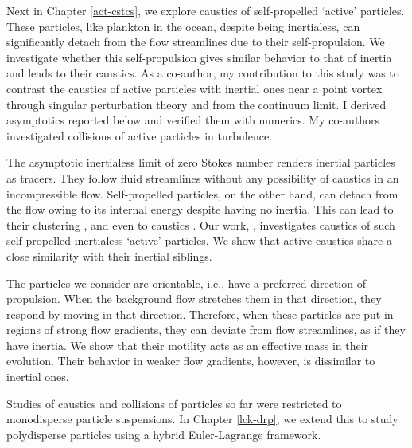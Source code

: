 \documentclass[../Rajarshi-thesis-draft.tex]{subfiles}
\begin{document}

Next in Chapter \ref{act-cstcs}, we explore caustics of self-propelled `active' particles. These particles, like plankton in the ocean, despite being inertialess, can significantly detach from the flow streamlines due to their self-propulsion. We investigate whether this self-propulsion gives similar behavior to that of inertia and leads to their caustics. As a co-author, my contribution to this study was to contrast the caustics of active particles with inertial ones near a point vortex through singular perturbation theory and from the continuum limit. I derived asymptotics reported below and verified them with numerics. My co-authors investigated collisions of active particles in turbulence.


The asymptotic inertialess limit of zero Stokes number renders inertial particles as tracers. They follow fluid streamlines without any possibility of caustics in an incompressible flow. Self-propelled particles, on the other hand, can detach from the flow owing to its internal energy despite having no inertia. This can lead to their clustering \cite{durham2013}, and even to caustics \cite{chajwa2026}. Our work, \citet{chajwa2026}, investigates caustics of such self-propelled inertialess `active' particles. We show that active caustics share a close similarity with their inertial siblings.

The particles we consider are orientable, i.e., have a preferred direction of propulsion. When the background flow stretches them in that direction, they respond by moving in that direction. Therefore, when these particles are put in regions of strong flow gradients, they can deviate from flow streamlines, as if they have inertia. We show that their motility acts as an effective mass in their evolution. Their behavior in weaker flow gradients, however, is dissimilar to inertial ones.


Studies of caustics and collisions of particles so far were restricted to monodisperse particle suspensions. In Chapter \ref{lck-drp}, we extend this to study polydisperse particles using a hybrid Euler-Lagrange framework. 
\end{document}
